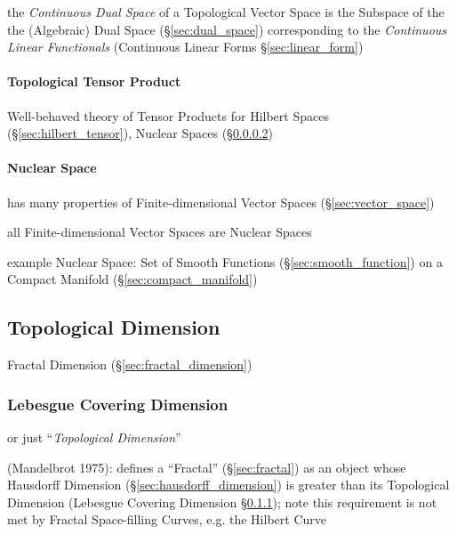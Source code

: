 the \emph{Continuous Dual Space} of a Topological Vector Space is the Subspace
of the the (Algebraic) Dual Space (\S\ref{sec:dual_space}) corresponding to the
\emph{Continuous Linear Functionals} (Continuous Linear Forms
\S\ref{sec:linear_form})



\paragraph{Topological Tensor Product}\label{sec:topological_tensor}
\hfill

Well-behaved theory of Tensor Products for Hilbert Spaces
(\S\ref{sec:hilbert_tensor}), Nuclear Spaces
(\S\ref{sec:nuclear_space})



\paragraph{Nuclear Space}\label{sec:nuclear_space}\hfill

has many properties of Finite-dimensional Vector Spaces
(\S\ref{sec:vector_space})

all Finite-dimensional Vector Spaces are Nuclear Spaces

example Nuclear Space: Set of Smooth Functions
(\S\ref{sec:smooth_function}) on a Compact Manifold
(\S\ref{sec:compact_manifold})



\subsection{Topological Dimension}\label{sec:topological_dimension}

\fist Fractal Dimension (\S\ref{sec:fractal_dimension})



\subsubsection{Lebesgue Covering Dimension}\label{sec:lebesgue_dimension}

or just ``\emph{Topological Dimension}''

(Mandelbrot 1975): defines a ``Fractal'' (\S\ref{sec:fractal}) as an object
whose Hausdorff Dimension (\S\ref{sec:hausdorff_dimension}) is greater than its
Topological Dimension (Lebesgue Covering Dimension
\S\ref{sec:lebesgue_dimension}); note this requirement is not met by Fractal
Space-filling Curves, e.g. the Hilbert Curve



